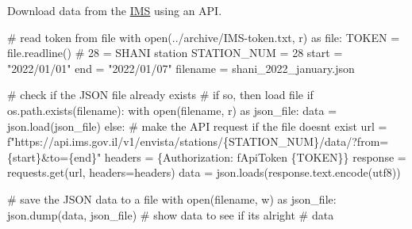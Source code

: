 \documentclass[
  letterpaper,
  DIV=11,
  numbers=noendperiod,
  oneside]{scrreprt}
\newenvironment{Shaded}{\begin{snugshade}}{\end{snugshade}}
\newcommand{\BuiltInTok}[1]{\textcolor[rgb]{0.00,0.23,0.31}{#1}}
\newcommand{\CommentTok}[1]{\textcolor[rgb]{0.37,0.37,0.37}{#1}}
\newcommand{\ControlFlowTok}[1]{\textcolor[rgb]{0.00,0.23,0.31}{#1}}
\newcommand{\DecValTok}[1]{\textcolor[rgb]{0.68,0.00,0.00}{#1}}
\newcommand{\ImportTok}[1]{\textcolor[rgb]{0.00,0.46,0.62}{#1}}
\newcommand{\NormalTok}[1]{\textcolor[rgb]{0.00,0.23,0.31}{#1}}
\newcommand{\OperatorTok}[1]{\textcolor[rgb]{0.37,0.37,0.37}{#1}}
\newcommand{\SpecialCharTok}[1]{\textcolor[rgb]{0.37,0.37,0.37}{#1}}
\newcommand{\SpecialStringTok}[1]{\textcolor[rgb]{0.13,0.47,0.30}{#1}}
\newcommand{\StringTok}[1]{\textcolor[rgb]{0.13,0.47,0.30}{#1}}
\begin{document}
Download data from the \href{https://ims.gov.il/en/data_gov}{IMS} using
an API.

\begin{Shaded}
\begin{Highlighting}[]
\CommentTok{\# read token from file}
\ControlFlowTok{with} \BuiltInTok{open}\NormalTok{(}\StringTok{\textquotesingle{}../archive/IMS{-}token.txt\textquotesingle{}}\NormalTok{, }\StringTok{\textquotesingle{}r\textquotesingle{}}\NormalTok{) }\ImportTok{as} \BuiltInTok{file}\NormalTok{:}
\NormalTok{    TOKEN }\OperatorTok{=} \BuiltInTok{file}\NormalTok{.readline()}
\CommentTok{\# 28 = SHANI station}
\NormalTok{STATION\_NUM }\OperatorTok{=} \DecValTok{28}
\NormalTok{start }\OperatorTok{=} \StringTok{"2022/01/01"}
\NormalTok{end }\OperatorTok{=} \StringTok{"2022/01/07"}
\NormalTok{filename }\OperatorTok{=} \StringTok{\textquotesingle{}shani\_2022\_january.json\textquotesingle{}}

\CommentTok{\# check if the JSON file already exists}
\CommentTok{\# if so, then load file}
\ControlFlowTok{if}\NormalTok{ os.path.exists(filename):}
    \ControlFlowTok{with} \BuiltInTok{open}\NormalTok{(filename, }\StringTok{\textquotesingle{}r\textquotesingle{}}\NormalTok{) }\ImportTok{as}\NormalTok{ json\_file:}
\NormalTok{        data }\OperatorTok{=}\NormalTok{ json.load(json\_file)}
\ControlFlowTok{else}\NormalTok{:}
    \CommentTok{\# make the API request if the file doesn\textquotesingle{}t exist}
\NormalTok{    url }\OperatorTok{=} \SpecialStringTok{f"https://api.ims.gov.il/v1/envista/stations/}\SpecialCharTok{\{}\NormalTok{STATION\_NUM}\SpecialCharTok{\}}\SpecialStringTok{/data/?from=}\SpecialCharTok{\{}\NormalTok{start}\SpecialCharTok{\}}\SpecialStringTok{\&to=}\SpecialCharTok{\{}\NormalTok{end}\SpecialCharTok{\}}\SpecialStringTok{"}
\NormalTok{    headers }\OperatorTok{=}\NormalTok{ \{}\StringTok{\textquotesingle{}Authorization\textquotesingle{}}\NormalTok{: }\SpecialStringTok{f\textquotesingle{}ApiToken }\SpecialCharTok{\{}\NormalTok{TOKEN}\SpecialCharTok{\}}\SpecialStringTok{\textquotesingle{}}\NormalTok{\}}
\NormalTok{    response }\OperatorTok{=}\NormalTok{ requests.get(url, headers}\OperatorTok{=}\NormalTok{headers)}
\NormalTok{    data }\OperatorTok{=}\NormalTok{ json.loads(response.text.encode(}\StringTok{\textquotesingle{}utf8\textquotesingle{}}\NormalTok{))}
    
    \CommentTok{\# save the JSON data to a file}
    \ControlFlowTok{with} \BuiltInTok{open}\NormalTok{(filename, }\StringTok{\textquotesingle{}w\textquotesingle{}}\NormalTok{) }\ImportTok{as}\NormalTok{ json\_file:}
\NormalTok{        json.dump(data, json\_file)}
\CommentTok{\# show data to see if it\textquotesingle{}s alright}
\CommentTok{\# data}
\end{Highlighting}
\end{Shaded}
\end{document}
